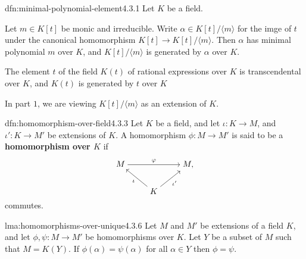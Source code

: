 \documentclass[landscape, 8pt]{extarticle}
\begin{document}
\begin{multicols}{3}

\begin{dfn}[]{dfn:minimal-polynomial-element}{4.3.1}
    Let $K$ be a field.
    \begin{enumerate-tight}
        \item Let $m\in K[t]$ be monic and irreducible. Write $\alpha\in K[t] /\langle m \rangle$ for the imge of $t$ under the canonical homomorphism $K[t] \to K[t] / \langle m \rangle$. Then $\alpha$ has minimal polynomial $m$ over $K$, and $K[t] /\langle m \rangle$ is generated by $\alpha$ over $K$.
        \item The element $t$ of the field $K(t)$ of rational expressions over $K$ is transcendental over $K$, and $K(t)$ is generated by $t$ over $K$
    \end{enumerate-tight}
    In part $1$, we are viewing $K[t] / \langle m \rangle$ as an extension of $K$.
\end{dfn}

\newpage
\begin{dfn}{dfn:homomorphism-over-field}{4.3.3}
    Let $K$ be a field, and let $\iota : K \to M$, and $\iota' : K \to M'$ be extensions of $K$. A homomorphism $\phi : M \to M'$ is said to be a \textbf{homomorphism over $K$} if
\[\begin{tikzcd}[cramped]
	M && {M,} \\
	& K
	\arrow["\phi", from=1-1, to=1-3]
	\arrow["\iota", from=2-2, to=1-1]
	\arrow["{\iota'}"', from=2-2, to=1-3]
\end{tikzcd}\]
commutes.
\end{dfn}

\begin{lma}{lma:homomorphisms-over-unique}{4.3.6}
    Let $M$ and $M'$ be extensions of a field $K$, and let $\phi, \psi : M \to M'$ be homomorphisms over $K$. Let $Y$ be a subset of $M$ such that $M = K(Y)$. If $\phi(\alpha) = \psi(\alpha)$ for all $\alpha\in Y$ then $\phi = \psi$.
\end{lma}


\end{multicols}
\end{document}
